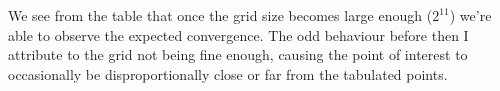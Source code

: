 \documentclass[12pt, letterpaper]{article}
\begin{document}
We see from the table that once the grid size becomes large enough (\(2^{11}\))
we're able to observe the expected convergence. The odd behaviour before then I
attribute to the grid not being fine enough, causing the point of interest to
occasionally be disproportionally close or far from the tabulated points.
\end{document}
